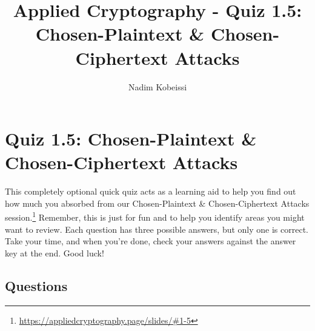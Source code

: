 \documentclass[10pt,a4paper,american]{exam}
\title{Applied Cryptography - Quiz 1.5: Chosen-Plaintext \& Chosen-Ciphertext Attacks}
\author{Nadim Kobeissi}
\begin{document}
\classhandoutheader
\section*{Quiz 1.5: Chosen-Plaintext \& Chosen-Ciphertext Attacks}

\begin{tcolorbox}[colframe=OliveGreen!30!white,colback=OliveGreen!5!white]
	This completely optional quick quiz acts as a learning aid to help you find out how much you absorbed from our Chosen-Plaintext \& Chosen-Ciphertext Attacks session.\footnote{\url{https://appliedcryptography.page/slides/\#1-5}} Remember, this is just for fun and to help you identify areas you might want to review. Each question has three possible answers, but only one is correct. Take your time, and when you're done, check your answers against the answer key at the end. Good luck!
\end{tcolorbox}

\subsection*{Questions}
\end{document}
